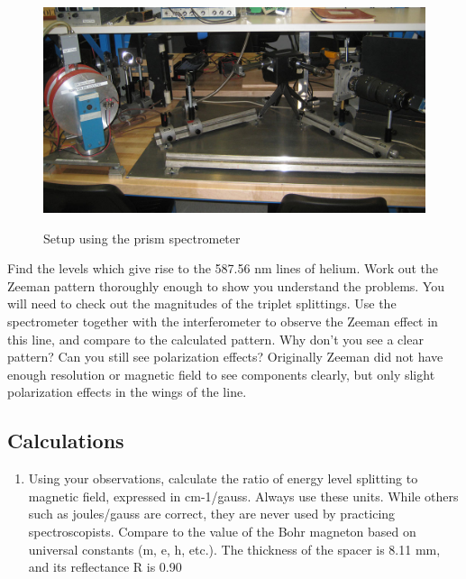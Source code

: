 \documentclass{../lab}
\begin{document}
\begin{enumerate}
    \begin{figure}[H]
    \centering
        \href{http://experimentationlab.berkeley.edu/sites/default/files/images/ATM_Zeeman_3489-Crop-Lg.jpg}{\includegraphics[width=0.8\linewidth]{images/ATM_Zeeman_3489-Crop-Lg.jpg}} \\
        \caption{Setup using the prism spectrometer}
        \label{PrismSpectrometer}
    \end{figure}
    
    Find the levels which give rise to the 587.56 nm lines of helium. Work out the Zeeman pattern thoroughly enough to show you understand the problems. You will need to check out the magnitudes of the triplet splittings. Use the spectrometer together with the interferometer to observe the Zeeman effect in this line, and compare to the calculated pattern. Why don't you see a clear pattern? Can you still see polarization effects? Originally Zeeman did not have enough resolution or magnetic field to see components clearly, but only slight polarization effects in the wings of the line.

\end{enumerate}

\subsection{Calculations}

\begin{enumerate}
    \item Using your observations, calculate the ratio of energy level splitting to magnetic field, expressed in cm-1/gauss. Always use these units. While others such as joules/gauss are correct, they are never used by practicing spectroscopists. Compare to the value of the Bohr magneton based on universal constants (m, e, h, etc.). The thickness of the spacer is 8.11 mm, and its reflectance R is 0.90
\end{enumerate}
\end{document}
